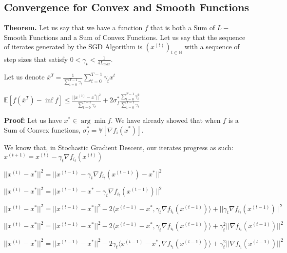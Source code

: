 \subsection{Convergence for Convex and Smooth Functions}
\noindent \textbf{Theorem.} Let us say that we have a function $f$ that is both a Sum of $L-$Smooth Functions and a Sum of Convex Functions. Let us say that the sequence of iterates generated by the SGD Algorithm is $(x^{(t)})_{t \in \mathbb{N}}$ with a sequence of step sizes that satisfy $0 < \gamma_t < \frac{1}{4L_{max}}$. 

Let us denote $\bar{x}^T = \frac{1}{\sum_{t = 0}^{T - 1} \gamma_t} \sum_{t = 0}^{T - 1} \gamma_t x^t$ \newline 

$\mathbb{E}[f(\bar{x}^T) - \inf f] \leq \frac{||x^{(0)} - x^*||^2}{\sum_{t = 0}^{T - 1} \gamma_t} + 2\sigma_f^* \frac{\sum_{t = 0}^{T - 1} \gamma_t^2}{\sum_{t = 0}^{T - 1} \gamma_t}$

\noindent \textbf{Proof:} \newline 
Let us have $x^* \in \arg \min f$. We have already showed that when $f$ is a Sum of Convex functions, $\sigma_f^* = \mathbb{V}[\nabla f_i(x^*)]$. 

We know that, in Stochastic Gradient Descent, our iterates progress as such: $x^{(t + 1)}  = x^{(t)} - \gamma_t \nabla f_{i_t}(x^{(t)})$ \newline 

$||x^{(t)} - x^*||^2 = ||x^{(t - 1)} - \gamma_t \nabla f_{i_t}(x^{(t - 1)}) - x^*||^2$ \newline 

$||x^{(t)} - x^*||^2 = ||x^{(t - 1)} - x^* - \gamma_t \nabla f_{i_t}(x^{(t - 1)})||^2$ \newline 

$||x^{(t)} - x^*||^2 = ||x^{(t - 1)} - x^*||^2 - 2\langle x^{(t - 1)} - x^*,  \gamma_t \nabla f_{i_t}(x^{(t - 1)})\rangle + ||\gamma_t \nabla f_{i_t}(x^{(t - 1)})||^2$ \newline 

$||x^{(t)} - x^*||^2 = ||x^{(t - 1)} - x^*||^2 - 2\langle x^{(t - 1)} - x^*,  \gamma_t \nabla f_{i_t}(x^{(t - 1)})\rangle + \gamma_t^2 ||\nabla f_{i_t}(x^{(t - 1)})||^2$ \newline 

$||x^{(t)} - x^*||^2 = ||x^{(t - 1)} - x^*||^2 - 2\gamma_t \langle x^{(t - 1)} - x^*,  \nabla f_{i_t}(x^{(t - 1)})\rangle + \gamma_t^2 ||\nabla f_{i_t}(x^{(t - 1)})||^2$ \newline 


